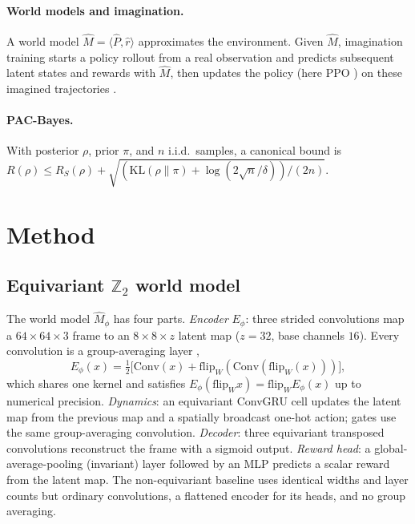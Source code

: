 \documentclass[preprint,12pt]{elsarticle}
\begin{document}
\paragraph{World models and imagination.}
A world model $\hat M=\langle\hat P,\hat r\rangle$ approximates the
environment. Given $\hat M$, imagination training starts a policy rollout
from a real observation and predicts subsequent latent states and rewards
with $\hat M$, then updates the policy (here PPO \cite{ppo2017}) on these
imagined trajectories \cite{dreamerv3}.

\paragraph{PAC-Bayes.}
With posterior $\rho$, prior $\pi$, and $n$ i.i.d.\ samples, a canonical
bound is
$R(\rho)\le R_S(\rho)+\sqrt{(\mathrm{KL}(\rho\|\pi)+\log(2\sqrt n/\delta))/(2n)}$.

\section{Method}\label{sec:method}

\subsection{Equivariant $\mathbb Z_2$ world model}
The world model $\hat M_\phi$ has four parts.
\emph{Encoder} $E_\phi$: three strided convolutions map a
$64\times64\times3$ frame to an $8\times8\times z$ latent map
($z=32$, base channels $16$). Every convolution is a group-averaging layer
\cite{gcnn2016},
\begin{equation}
  E_\phi(x)=\tfrac12\big[\mathrm{Conv}(x)+\mathrm{flip}_W(\mathrm{Conv}(\mathrm{flip}_W(x)))\big],
\end{equation}
which shares one kernel and satisfies
$E_\phi(\mathrm{flip}_W x)=\mathrm{flip}_W E_\phi(x)$ up to numerical
precision. \emph{Dynamics}: an equivariant ConvGRU cell updates the latent
map from the previous map and a spatially broadcast one-hot action; gates
use the same group-averaging convolution. \emph{Decoder}: three equivariant
transposed convolutions reconstruct the frame with a sigmoid output.
\emph{Reward head}: a global-average-pooling (invariant) layer followed by an
MLP predicts a scalar reward from the latent map. The non-equivariant
baseline uses identical widths and layer counts but ordinary convolutions, a
flattened encoder for its heads, and no group averaging.
\end{document}
